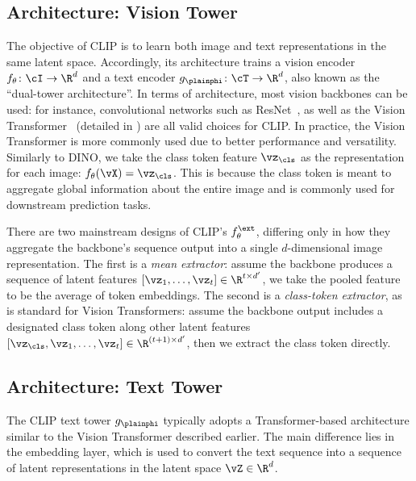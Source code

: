 \documentclass[../../book-main.tex]{subfiles}
\begin{document}
\subsection{Architecture: Vision Tower}\label{sub:clip_vision_tower}
The objective of CLIP is to learn both image and text representations in the same latent space.
Accordingly, its architecture trains a vision encoder \(f_{\theta} \colon \cI \to \R^{d} \) and a text encoder \(g_{\plainphi} \colon \cT \to \R^{d} \), also known as the ``dual-tower architecture''.
In terms of architecture, most vision backbones can be used: for instance, convolutional networks such as ResNet~\citep{He2016-lc}, as well as the Vision Transformer~\citep{dosovitskiy2020image} (detailed in ) are all valid choices for CLIP.
In practice, the Vision Transformer is more commonly used due to better performance and versatility.
Similarly to DINO, we take the class token feature \(\vz_{\cls}\) as the representation for each image: \(f_{\theta}(\vX) = \vz_{\cls}\).
This is because the class token is meant to aggregate global information about the entire image and is commonly used for downstream prediction tasks.

There are two mainstream designs of CLIP's \(f^{\ext}_{\theta}\), differing only in how they aggregate the backbone's sequence output into a single \(d\)-dimensional image representation.
The first is a \textit{mean extractor}: assume the backbone produces a sequence of latent features \([\vz_{1}, \dots, \vz_{t}] \in \R^{t \times d'}\), we take the pooled feature to be the average of token embeddings.
The second is a \textit{class-token extractor}, as is standard for Vision Transformers: assume the backbone output includes a designated class token along other latent features \([\vz_{\cls}, \vz_{1}, \dots, \vz_{t}] \in \R^{(t+1) \times d'}\), then we extract the class token directly.

\subsection{Architecture: Text Tower}
The CLIP text tower \(g_{\plainphi}\) typically adopts a Transformer-based architecture similar to the Vision Transformer described earlier.
The main difference lies in the embedding layer, which is used to convert the text sequence into a sequence of latent representations in the latent space \(\vZ \in \R^{d}\).
\end{document}
